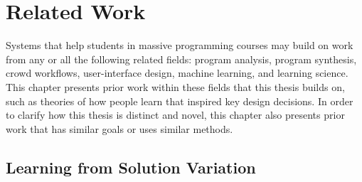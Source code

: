\chapter{Related Work}\label{chapter:relatedwork}

Systems that help students in massive programming courses may build on work from any or all the following related fields: program analysis, program synthesis, crowd workflows, user-interface design, machine learning, and learning science. This chapter presents prior work within these fields that this thesis builds on, such as theories of how people learn that inspired key design decisions. In order to clarify how this thesis is distinct and novel, this chapter also presents prior work that has similar goals or uses similar methods.

\section{Learning from Solution Variation}

\begin{comment}
Marton et al.'s variation theory \cite{Marton13} holds that in order to learn something, one must see examples that vary along particular dimensions: ``contrast,'' as in pairing it with something it is not; ``generalization,'' as in presenting multiple instances of the object or concept to be learned, varying only that which is irrelevant; ``separation,'' as in presenting multiple instances of the object or concept, varying only that which can vary internally without changing the object or concept into something else; and ``fusion,'' as in seeing multiple examples in which previously analytically separated aspects must be processed together to recognize the object or concept. The aspects which are related to these dimensions of variation and therefore define the object or concept are called ``critical features.''
\end{comment}


